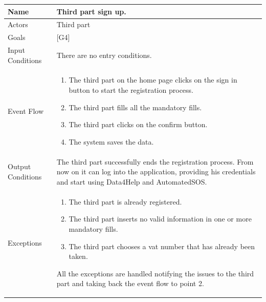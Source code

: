 \documentclass{article}
\begin{document}
\begin{center}
    \begin{tabular}{ | l | p{10cm} |}
    \hline
    Name & Third part sign up.\\ \hline
    Actors & Third part\\ \hline
   	Goals & {[G4]}\\ \hline
    Input Conditions & There are no entry conditions.\\ \hline
    Event Flow & \begin{enumerate}
    	\item The third part on the home page clicks on the sign in button to start the registration process.
		\item The third part fills all the mandatory fills.
		\item The third part clicks on the confirm button.
		\item The system saves the data.
    \end{enumerate} \\ \hline
    Output Conditions & The third part successfully ends the registration process. From now on it can log into the application, providing his credentials and start using Data4Help and AutomatedSOS.  \\ \hline
    Exceptions & \begin{enumerate}
    \item The third part is already registered.
	\item The third part inserts no valid information in one or more mandatory fills.
	\item The third part chooses a vat number that has already been taken. 
\end{enumerate} All the exceptions are handled notifying the issues to the third part and taking back the event flow to point 2.  \\ \hline
    \end{tabular}
\end{center}
\end{document}
